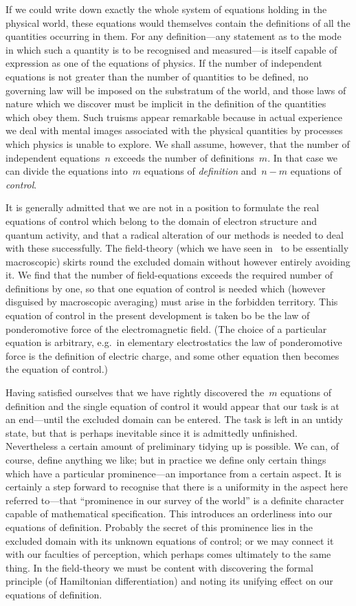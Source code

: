 \documentclass[12pt]{book}
\begin{document}
If we could write down exactly the whole system of equations holding in the physical world,
these equations would themselves contain the definitions of all the quantities occurring in them.
For any definition---any statement as to the mode in which such a quantity is to be recognised and
measured---is itself capable of expression as one of the equations of physics.
If the number of independent equations is not greater than the number of quantities to be defined,
no governing law will be imposed on the substratum of the world, and those laws of nature which we
discover must be implicit in the definition of the quantities which obey them.
Such truisms appear remarkable because in actual experience we deal with mental images associated with
the physical quantities by processes which physics is unable to explore.
We shall assume, however, that the number of independent equations~$n$ exceeds the number of definitions~$m$.
In that case we can divide the equations into~$m$ equations of \emph{definition} and~$n-m$ equations of \emph{control}.

It is generally admitted that we are not in a position to formulate the real equations of control which belong
to the domain of electron structure and quantum activity, and that a radical alteration of our methods is needed
to deal with these successfully.
The field-theory (which we have seen in~ to be essentially macroscopic) skirts round the excluded domain
without however entirely avoiding it.
We find that the number of field-equations exceeds the required number of definitions by one, so that one
equation of control is needed which (however disguised by macroscopic averaging) must arise in the
forbidden territory.
This equation of control in the present development is taken bo be the law of ponderomotive force of the
electromagnetic field.
(The choice of a particular equation is arbitrary, e.g.\ in elementary electrostatics the law of ponderomotive
force is the definition of electric charge, and some other equation then becomes the equation of control.)

Having satisfied ourselves that we have rightly discovered the~$m$ equations of definition and the single equation
of control it would appear that our task is at an end---until the excluded domain can be entered.
The task is left in an untidy state, but that is perhaps inevitable since it is admittedly unfinished.
Nevertheless a certain amount of preliminary tidying up is possible.
We can, of course, define anything we like; but in practice we define only certain things which have a
particular prominence---an importance from a certain aspect.
It is certainly a step forward to recognise that there is a uniformity in the aspect here referred to---that
``prominence in our survey of the world'' is a definite character capable of mathematical specification.
This introduces an orderliness into our equations of definition.
Probably the secret of this prominence lies in the excluded domain with its unknown equations of control;
or we may connect it with our faculties of perception, which perhaps comes ultimately to the same thing.
In the field-theory we must be content with discovering the formal principle (of Hamiltonian differentiation)
and noting its unifying effect on our equations of definition.
\end{document}
